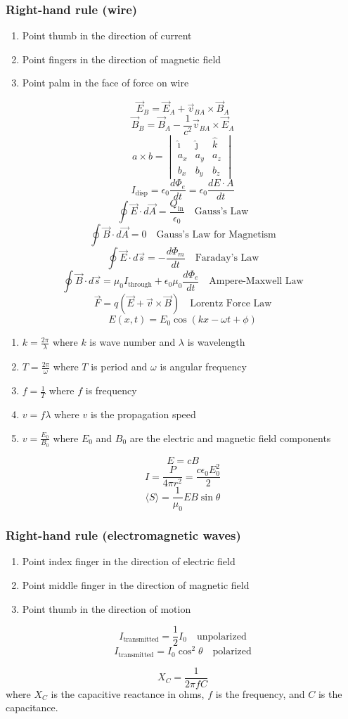 \documentclass[8pt,twocolumn]{extarticle}
\begin{document}
\subsubsection*{Right-hand rule (wire)}
\begin{enumerate}
    \item Point thumb in the direction of current
    \item Point fingers in the direction of magnetic field
    \item Point palm in the face of force on wire
\end{enumerate}
\[\vec{E}_B = \vec{E}_A + \vec{v}_{BA}\times \vec{B}_A\]
\[\vec{B}_B = \vec{B}_A - \frac{1}{c^2}\vec{v}_{BA}\times \vec{E}_A\]
\[a\times b = \begin{vmatrix}
    \hat{\imath} & \hat{\jmath} & \hat{k} \\
    a_x & a_y & a_z \\
    b_x & b_y & b_z
\end{vmatrix}\]
\[I_\text{disp}=\epsilon_0\frac{d\Phi_e}{dt}=\epsilon_0 \frac{dE\cdot A}{dt}\]
\[\oint\vec{E}\cdot d\vec{A}=\frac{Q_\text{in}}{\epsilon_0}\quad\text{Gauss's Law}\]
\[\oint\vec{B}\cdot d\vec{A}=0\quad\text{Gauss's Law for Magnetism}\]
\[\oint\vec{E}\cdot d\vec{s} = -\frac{d\Phi_m}{dt}\quad\text{Faraday's Law}\]
\[\oint\vec{B}\cdot d\vec{s} = \mu_0 I_\text{through} + \epsilon_0 \mu_0 \frac{d\Phi_e}{dt}\quad\text{Ampere-Maxwell Law}\]
\[\vec{F}=q(\vec{E} + \vec{v} \times \vec{B})\quad\text{Lorentz Force Law}\]
\[E(x, t) = E_0 \cos\left(kx - \omega t + \phi\right)\]
\begin{enumerate}
    \item $k=\frac{2\pi}{\lambda}$ where $k$ is wave number and $\lambda$ is wavelength
    \item $T=\frac{2\pi}{\omega}$ where $T$ is period and $\omega$ is angular frequency
    \item $f=\frac{1}{T}$ where $f$ is frequency
    \item $v=f\lambda$ where $v$ is the propagation speed
    \item $v=\frac{E_0}{B_0}$ where $E_0$ and $B_0$ are the electric and magnetic field components
\end{enumerate}
\[E=cB\]
\[I=\frac{P}{4\pi r^2}=\frac{c\epsilon_0 E_0^2}{2}\]
\[\langle S \rangle = \frac{1}{\mu_0}EB\sin\theta\]
\subsubsection*{Right-hand rule (electromagnetic waves)}
\begin{enumerate}
    \item Point index finger in the direction of electric field
    \item Point middle finger in the direction of magnetic field
    \item Point thumb in the direction of motion
\end{enumerate}
\[I_\text{transmitted}=\frac{1}{2} I_0\quad\text{unpolarized}\]
\[I_\text{transmitted}=I_0\cos^2\theta\quad\text{polarized}\]

\[X_C = \frac{1}{2\pi fC}\] where $X_C$ is the capacitive reactance in ohms, $f$ is the frequency,
and $C$ is the capacitance.
\end{document}
